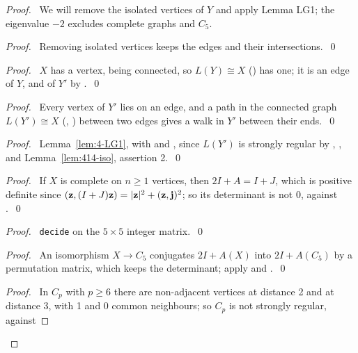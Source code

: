 \begin{proof}
 \pfsketch\ We will remove the isolated vertices of $Y$ and apply Lemma LG1; the eigenvalue $-2$
 excludes complete graphs and $C_5$.
 \begin{proof}\pf\ Removing isolated vertices keeps the edges and their
  intersections.~\qed\end{proof}
 \begin{proof}\pf\ $X$ has a vertex, being connected, so $L(Y)\cong X$ () has one; it is
  an edge of $Y$, and of $Y'$ by .~\qed\end{proof}
 \begin{proof}\pf\ Every vertex of $Y'$ lies on an edge, and a path in the connected graph
  $L(Y')\cong X$ (, ) between two edges gives a walk in $Y'$ between
  their ends.~\qed\end{proof}
 \begin{proof}\pf\ Lemma~\ref{lem:4-LG1}, with  and ,
  since $L(Y')$ is strongly regular by , ,  and
  Lemma~\ref{lem:414-iso}, assertion 2.~\qed\end{proof}
 \begin{proof}\pf\ If $X$ is complete on $n\ge1$ vertices, then $2I+A=I+J$, which is positive
  definite since $({\mathbf z},(I+J){\mathbf z})=|{\mathbf z}|^2+({\mathbf z},{\mathbf j})^2$; so its determinant is not 0, against
  .~\qed\end{proof}
 \begin{proof}\pf\ \texttt{decide} on the $5\times5$ integer matrix.~\qed\end{proof}
 \begin{proof}\pf\ An isomorphism $X\to C_5$ conjugates $2I+A(X)$ into $2I+A(C_5)$ by a
  permutation matrix, which keeps the determinant; apply  and
  .~\qed\end{proof}
 \begin{proof}\pf\ In $C_p$ with $p\ge6$ there are non-adjacent vertices at distance 2 and at
  distance 3, with 1 and 0 common neighbours; so $C_p$ is not strongly regular, against

\end{proof}
\end{proof}
